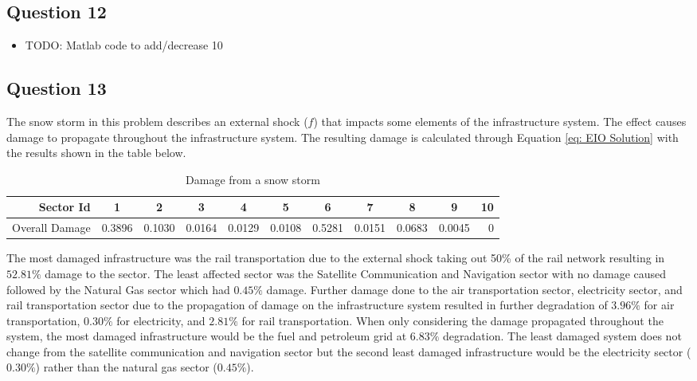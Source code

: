 \documentclass[11pt,a4paper]{article}
\begin{document}
\subsection*{Question 12}
\begin{itemize}
	\item TODO: Matlab code to add/decrease 10%
\end{itemize}

\subsection*{Question 13}
The snow storm in this problem describes an external shock ($f$) that impacts some elements of the infrastructure system. The effect causes damage to propagate throughout the infrastructure system. The resulting damage is calculated through Equation \ref{eq: EIO Solution} with the results shown in the table below.
\begin{table}[H]
  \centering
  \caption{Damage from a snow storm}
    \begin{tabular}{r|rrrrrrrrrr}
    \toprule
    Sector Id & \multicolumn{1}{c}{1} & \multicolumn{1}{c}{2} & \multicolumn{1}{c}{3} & \multicolumn{1}{c}{4} & \multicolumn{1}{c}{5} & \multicolumn{1}{c}{6} & \multicolumn{1}{c}{7} & \multicolumn{1}{c}{8} & \multicolumn{1}{c}{9} & \multicolumn{1}{c}{10} \\
    \midrule
    Overall Damage      & 0.3896 & 0.1030 & 0.0164 & 0.0129 & 0.0108 & 0.5281 & 0.0151 & 0.0683 & 0.0045 & 0 \\
    \bottomrule
    \end{tabular}%
  \label{tab: Snow storm 13}%
\end{table}%
The most damaged infrastructure was the rail transportation due to the external shock taking out 50\% of the rail network resulting in $52.81\%$ damage to the sector. The least affected sector was the Satellite Communication and Navigation sector with no damage caused followed by the Natural Gas sector which had $0.45\%$ damage.
Further damage done to the air transportation sector, electricity sector, and rail transportation sector due to the propagation of damage on the infrastructure system resulted in further degradation of $3.96\%$ for air transportation, $0.30\%$ for electricity, and $2.81\%$ for rail transportation. When only considering the damage propagated throughout the system, the most damaged infrastructure would be the fuel and petroleum grid at $6.83\%$ degradation. The least damaged system does not change from the satellite communication and navigation sector but the second least damaged infrastructure would be the electricity sector ($0.30\%$) rather than the natural gas sector ($0.45\%$).
\end{document}
